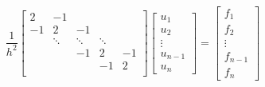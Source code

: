 \begin{equation}
    \frac{1}{h^2} \begin{bmatrix}
        2 & -1 \\
        -1 &2 &-1 \\
        &\ddots & \ddots & \ddots \\
        & & -1 & 2 & -1\\
        &&&-1&2\\
    \end{bmatrix} \begin{bmatrix}
        u_1 \\ u_2 \\ \vdots \\ u_{n-1} \\u_n
    \end{bmatrix} = \begin{bmatrix}
        f_1 \\ f_2 \\ \vdots \\ f_{n-1} \\f_n
    \end{bmatrix}
\end{equation}



